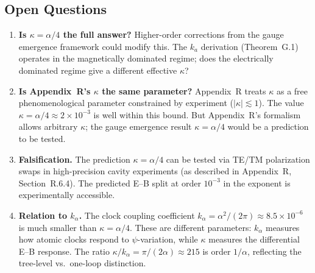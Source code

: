 \documentclass[11pt,a4paper]{article}
\theoremstyle{definition}
\theoremstyle{remark}
\begin{document}
\subsection{Open Questions}

\begin{enumerate}
\item \textbf{Is $\kappa = \alpha/4$ the full answer?}  Higher-order
corrections from the gauge emergence framework could modify this.
The $k_a$ derivation (Theorem~G.1) operates in the magnetically
dominated regime; does the electrically dominated regime give a
different effective $\kappa$?

\item \textbf{Is Appendix~R's $\kappa$ the same parameter?}
Appendix~R treats $\kappa$ as a free phenomenological parameter
constrained by experiment ($|\kappa| \lesssim 1$).  The value
$\kappa = \alpha/4 \approx 2 \times 10^{-3}$ is well within this
bound.  But Appendix~R's formalism allows arbitrary $\kappa$; the
gauge emergence result $\kappa = \alpha/4$ would be a prediction
to be tested.

\item \textbf{Falsification.}  The prediction $\kappa = \alpha/4$
can be tested via TE/TM polarization swaps in high-precision
cavity experiments (as described in Appendix~R, Section~R.6.4).
The predicted E--B split at order $10^{-3}$ in the exponent is
experimentally accessible.

\item \textbf{Relation to $k_\alpha$.}  The clock coupling
coefficient $k_\alpha = \alpha^2/(2\pi) \approx 8.5 \times 10^{-6}$
is much smaller than $\kappa = \alpha/4$.  These are different
parameters: $k_\alpha$ measures how atomic clocks respond to
$\psi$-variation, while $\kappa$ measures the differential
E--B response.  The ratio $\kappa/k_\alpha = \pi/(2\alpha) \approx 215$
is order $1/\alpha$, reflecting the tree-level vs.\ one-loop
distinction.
\end{enumerate}
\end{document}
